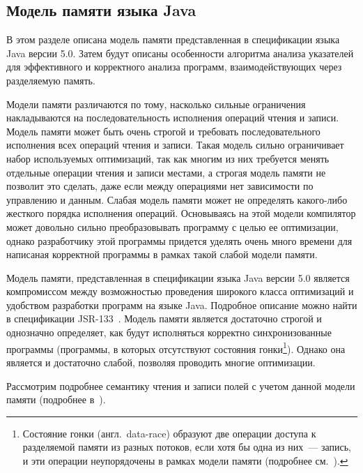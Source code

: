 \documentclass[14pt,titlepage]{extarticle}
\newcommand{\eng}[1]{{\English#1}}
\newcommand{\engdef}[1]{(англ.~\eng{#1})}
\begin{document}
    \subsection{Модель памяти языка Java}

      В этом разделе описана модель памяти представленная в спецификации языка
      Java версии 5.0.
      Затем будут описаны особенности алгоритма анализа указателей для
      эффективного и корректного анализа программ, взаимодействующих через
      разделяемую память.

      Модели памяти различаются по тому, насколько сильные ограничения
      накладываются на последовательность исполнения операций чтения и
      записи.
      Модель памяти может быть очень строгой и требовать
      последовательного исполнения всех операций чтения и записи.
      Такая модель сильно ограничивает набор используемых оптимизаций,
      так как многим из них требуется менять отдельные операции чтения и
      записи местами, а строгая модель памяти не позволит это сделать, даже
      если между операциями нет зависимости по управлению и данным.
      Слабая модель памяти может не определять какого-либо жесткого порядка
      исполнения операций. Основываясь на этой модели компилятор может
      довольно сильно преобразовывать программу с целью ее оптимизации,
      однако разработчику этой программы придется уделять очень много времени
      для написаная корректной программы в рамках такой слабой модели памяти.

      Модель памяти, представленная в спецификации языка Java версии 5.0
      является компромиссом между возможностью проведения широкого класса
      оптимизаций и удобством разработки программ на языке Java. Подробное
      описание можно найти в спецификации JSR-133~\cite{jsr133}. Модель памяти
      является достаточно строгой и однозначно определяет, как будут
      исполняться корректно синхронизованные программы (программы, в которых
      отсутствуют состояния гонки\footnote{Состояние гонки
      \engdef{data-race} образуют две операции доступа к
      разделяемой памяти из разных потоков, если хотя бы одна из них~---
      запись, и эти операции неупорядочены в рамках модели памяти (подробнее
      см.~\cite[раздел~2.1]{manson_jmm}).}).
      Однако она является и достаточно слабой, позволяя проводить многие
      оптимизации.

      Рассмотрим подробнее семантику чтения и записи полей с учетом данной
      модели памяти (подробнее в~\cite{jsr133_cookbook}).
\end{document}
